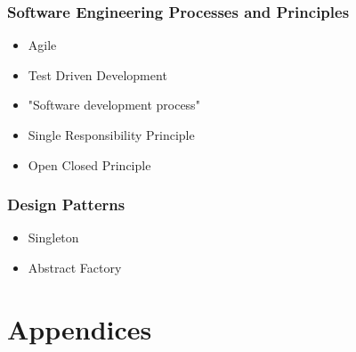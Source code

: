 

\toclineskip
\section{Software Engineering Processes and Principles}

\begin{itemize}
	\item Agile
	\item Test Driven Development
	\item "Software development process"
	\item Single Responsibility Principle
	\item Open Closed Principle
\end{itemize}


\toclineskip
\section{Design Patterns}

\begin{itemize}
	\item Singleton
	\item Abstract Factory
\end{itemize}

\newpage


\part*{Appendices}

\appendix

